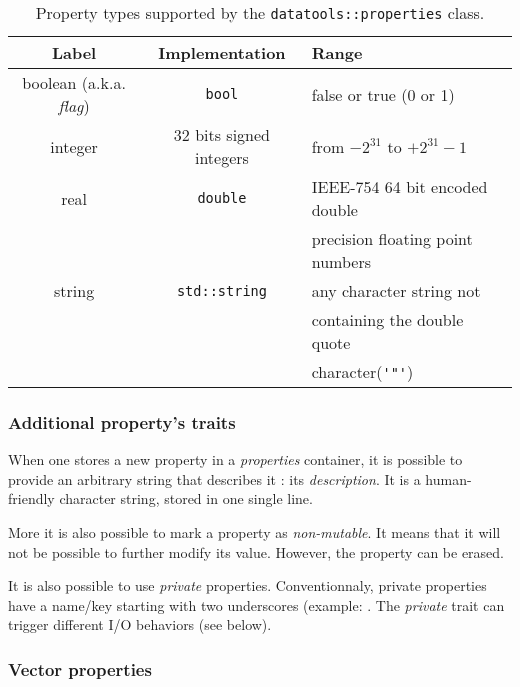 \begin{table}[h]
\begin{center}
\begin{tabular}{|c|c|l|}
\hline
Label      &   Implementation & Range \\
\hline
\hline
boolean (a.k.a. \emph{flag}) & \texttt{bool} & false or true (0 or 1)  \\
\hline
integer    & 32 bits signed integers & from $-2^{31}$ to $+2^{31}-1$ \\
\hline
real       & \texttt{double}  & IEEE-754 64 bit encoded double \\
           &                  & precision floating point numbers \\
\hline
string     &  \texttt{std::string} & any character string not \\
           &                       & containing the double quote \\
           &                       & character(\verb+'"'+) \\
\hline
\end{tabular}
\end{center}
\caption{Property         types        supported         by        the
  \texttt{datatools::properties} class.}
\label{tab::properties:types:0}
\end{table}



\subsubsection{Additional property's traits}

When one stores a new property in a \emph{properties} container, it is
possible to provide an arbitrary string that describes it : its \emph{description}.
It is a human-friendly character string, stored in one single line.

More it  is also possible to  mark  a property as  \emph{non-mutable}. It means
that it will not be possible to further modify its value. However, the
property can be erased.

It is also possible to use \emph{private} properties.  Conventionnaly,
private  properties  have  a  name/key starting  with  two  underscores
(example: . The \emph{private} trait can trigger different
I/O behaviors (see below).

\subsubsection{Vector properties}

